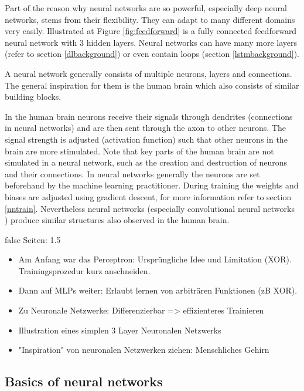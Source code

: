 \documentclass[draft,final,oneside]{vutinfth} %
\begin{document}
Part of the reason why neural networks are so powerful, especially deep neural networks, stems from their flexibility. They can adapt to many different domains very easily. Illustrated at Figure \ref{fig:feedforward} is a fully connected feedforward neural network with 3 hidden layers. Neural networks can have many more layers (refer to section \ref{dlbackground}) or even contain loops (section \ref{lstmbackground}).

A neural network generally consists of multiple neurons, layers and connections. The general inspiration for them is the human brain which also consists of similar building blocks.

In the human brain neurons receive their signals through dendrites (connections in neural networks) and are then sent through the axon to other neurons. The signal strength is adjusted (activation function) such that other neurons in the brain are more stimulated. Note that key parts of the human brain are not simulated in a neural network, such as the creation and destruction of neurons and their connections. In neural networks generally the neurons are set beforehand by the machine learning practitioner. During training the weights and biases are adjusted using gradient descent, for more information refer to section \ref{nntrain}. Nevertheless neural networks (especially convolutional neural networks \cite{cnnimg}) produce similar structures also observed in the human brain.


\if false
Seiten: 1.5

\begin{itemize}

\item Am Anfang war das Perceptron: Ursprüngliche Idee und Limitation (XOR). Trainingsprozedur kurz anschneiden.
\item Dann auf MLPs weiter: Erlaubt lernen von arbiträren Funktionen (zB XOR).
\item Zu Neuronale Netzwerke: Differenzierbar => effizienteres Trainieren
\item Illustration eines simplen 3 Layer Neuronalen Netzwerks
\item "Inspiration" von neuronalen Netzwerken ziehen: Menschliches Gehirn

\end{itemize}

\fi

\subsection{Basics of neural networks}
\end{document}
